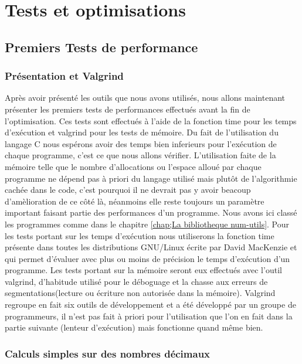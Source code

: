 
\chapter{Tests et optimisations}
\label{chap:tests et optimisations}

\section{Premiers Tests de performance}

\subsection{Pr\'esentation et Valgrind}
Apr\`es avoir pr\'esent\'e les outils que nous avons utilis\'es, nous allons maintenant pr\'esenter les premiers tests de performances effectu\'es 
avant la fin de l'optimisation.
Ces tests sont effectu\'es \`a l'aide de la fonction time pour les temps d'ex\'ecution et valgrind\citep{valgrind} pour les tests de m\'emoire.
Du fait de l'utilisation du langage C nous esp\'erons avoir des temps bien inferieurs pour l'ex\'ecution de chaque programme, c'est ce que nous allons
 v\'erifier.
L'utilisation faite de la m\'emoire telle que le nombre d'allocations ou l'espace allou\'e par chaque programme ne d\'epend pas \`a priori du langage
 utilis\'e mais plut\^ot de l'algorithmie cach\'ee dans le code, c'est pourquoi il ne devrait pas y avoir beacoup d'am\`elioration de ce c\^ot\'e l\`a,
n\'eanmoins elle reste toujours un param\`etre important faisant partie des performances d'un programme.
Nous avons ici class\'e les programmes comme dans le chapitre \ref{chap;La bibliotheque num-utils}.
Pour les tests portant sur les temps d'ex\'ecution nous utiliserons la fonction time pr\'esente dans toutes les distributions GNU/Linux \'ecrite par David MacKenzie 
et qui permet d'\'evaluer avec plus ou moins de pr\'ecision le temps d'ex\'ecution d'un programme.
Les tests portant sur la m\'emoire seront eux effectu\'es avec l'outil valgrind, d'habitude utilis\'e pour le d\'eboguage et la chasse aux erreurs de segmentations(lecture ou \'ecriture non autoris\'ee dans la m\'emoire).
Valgrind regroupe en fait six outils de d\'eveloppement et a \'et\'e d\'evelopp\'e par un groupe de programmeurs, il n'est pas fait \`a priori pour l'utilisation que l'on en fait dans la partie suivante (lenteur d'ex\'ecution) mais fonctionne quand m\^eme bien.
 

\subsection{Calculs simples sur des nombres d\'ecimaux}

